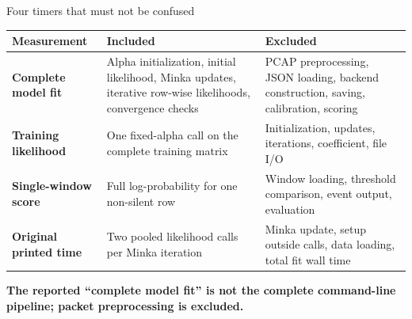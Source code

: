 \documentclass[aspectratio=169,10pt]{beamer}
\begin{document}
\begin{frame}{Four timers that must not be confused}
\scriptsize
\begin{tabular}{>{\bfseries}p{}p{}p{}}
\toprule
Measurement & Included & Excluded \\
\midrule
Complete model fit & Alpha initialization, initial likelihood, Minka updates,
iterative row-wise likelihoods, convergence checks & PCAP preprocessing, JSON
loading, backend construction, saving, calibration, scoring \\
\addlinespace
Training likelihood & One fixed-alpha call on the complete training matrix &
Initialization, updates, iterations, coefficient, file I/O \\
\addlinespace
Single-window score & Full log-probability for one non-silent row & Window
loading, threshold comparison, event output, evaluation \\
\addlinespace
Original printed time & Two pooled likelihood calls per Minka iteration &
Minka update, setup outside calls, data loading, total fit wall time \\
\bottomrule
\end{tabular}

\vspace{0.40cm}
{\color{burgundy}\bfseries
The reported ``complete model fit'' is not the complete command-line pipeline;
packet preprocessing is excluded.}
\end{frame}
\end{document}
